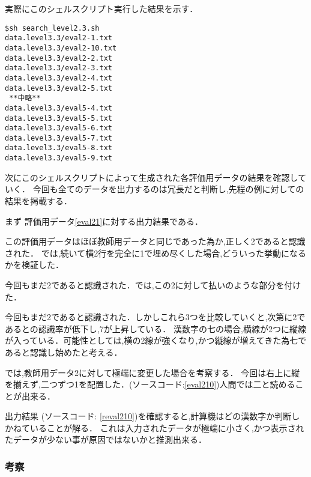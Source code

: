 実際にこのシェルスクリプト実行した結果を示す．

\begin{oframed}
    \begin{verbatim}
$sh search_level2.3.sh
data.level3.3/eval2-1.txt
data.level3.3/eval2-10.txt
data.level3.3/eval2-2.txt
data.level3.3/eval2-3.txt
data.level3.3/eval2-4.txt
data.level3.3/eval2-5.txt
 **中略**
data.level3.3/eval5-4.txt
data.level3.3/eval5-5.txt
data.level3.3/eval5-6.txt
data.level3.3/eval5-7.txt
data.level3.3/eval5-8.txt
data.level3.3/eval5-9.txt\end{verbatim}
\end{oframed}

次にこのシェルスクリプトによって生成された各評価用データの結果を確認していく．
今回も全てのデータを出力するのは冗長だと判断し,先程の例に対しての結果を掲載する．

まず 評価用データ\ref{eval21}に対する出力結果である．



この評価用データはほぼ教師用データと同じであった為か,正しく2であると認識された．
では,続いて横2行を完全に1で埋め尽くした場合,どういった挙動になるかを検証した．



今回もまだ2であると認識された．では,この2に対して払いのような部分を付けた．


今回もまだ2であると認識された．しかしこれら3つを比較していくと,次第に2であるとの認識率が低下し,7が上昇している．
漢数字の七の場合,横線が2つに縦線が入っている．可能性としては,横の2線が強くなり,かつ縦線が増えてきた為七であると認識し始めたと考える．

では,教師用データ2に対して極端に変更した場合を考察する．
今回は右上に縦を揃えず,二つずつ1を配置した．(ソースコード:\ref{eval210})人間では二と読めることが出来る．




出力結果 (ソースコード: \ref{reval210})を確認すると,計算機はどの漢数字か判断しかねていることが解る．
これは入力されたデータが極端に小さく,かつ表示されたデータが少ない事が原因ではないかと推測出来る．

\subsubsection{考察}
